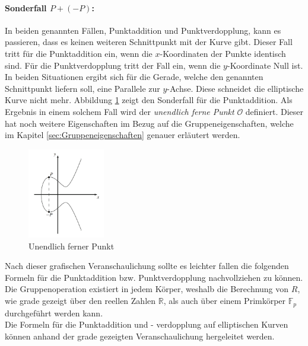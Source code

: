 \paragraph{Sonderfall $P + (-P)$:}
In beiden genannten Fällen, Punktaddition und Punktverdopplung, kann es passieren, dass es keinen weiteren Schnittpunkt mit der Kurve gibt. Dieser Fall tritt für die Punktaddition ein, wenn die $x$-Koordinaten der Punkte identisch sind. Für die Punktverdopplung tritt der Fall ein, wenn die $y$-Koordinate Null ist. In beiden Situationen ergibt sich für die Gerade, welche den genannten Schnittpunkt liefern soll, eine Parallele zur $y$-Achse. Diese schneidet die elliptische Kurve nicht mehr. Abbildung \ref{fig:UnendlichFernerPunkt} zeigt den Sonderfall für die Punktaddition. Als Ergebnis in einem solchem Fall wird der \textit{unendlich ferne Punkt} $\mathcal{O}$ definiert. Dieser hat noch weitere Eigenschaften im Bezug auf die Gruppeneigenschaften, welche im Kapitel \ref{sec:Gruppeneigenschaften} genauer erläutert werden.

\begin{figure}[H]
    \centering
    \includegraphics[width=0.3\textwidth]{grafiken/UnendlichFernerPunkt.PNG}
    \caption{Unendlich ferner Punkt}
    \label{fig:UnendlichFernerPunkt}
\end{figure}

Nach dieser grafischen Veranschaulichung sollte es leichter fallen die folgenden Formeln für die Punktaddition bzw. Punktverdopplung nachvollziehen zu können. Die Gruppenoperation existiert in jedem Körper, weshalb die Berechnung von $R$, wie grade gezeigt über den reellen Zahlen $\mathbb{R}$, als auch über einem Primkörper $\mathbb{F}_p$ durchgeführt werden kann.\cite[276-280]{Paar.2016}\\

Die Formeln für die Punktaddition und - verdopplung auf elliptischen Kurven können anhand der grade gezeigten Veranschaulichung hergeleitet werden.\\ 

